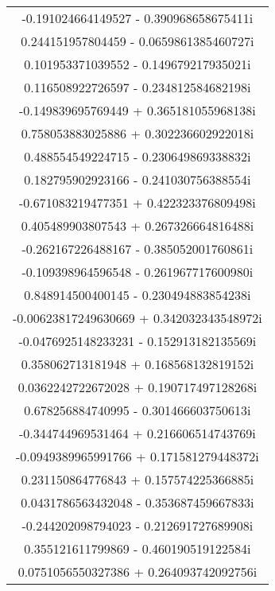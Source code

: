 \documentclass[12pt,a4paper,UTF8]{ctexart}
\begin{document}
\begin{enumerate}
\begin{longtable}{c}
              -0.191024664149527     -   0.390968658675411i   \\
              0.244151957804459      -   0.0659861385460727i  \\
              0.101953371039552      -   0.149679217935021i   \\
              0.116508922726597      -   0.234812584682198i   \\
              -0.149839695769449     +   0.365181055968138i   \\
              0.758053883025886      +   0.302236602922018i   \\
              0.488554549224715      -   0.230649869338832i   \\
              0.182795902923166      -   0.241030756388554i   \\
              -0.671083219477351     +   0.422323376809498i   \\
              0.405489903807543      +   0.267326664816488i   \\
              -0.262167226488167     -   0.385052001760861i   \\
              -0.109398964596548     -   0.261967717600980i   \\
              0.848914500400145      -   0.230494883854238i   \\
              -0.00623817249630669   +   0.342032343548972i   \\
              -0.0476925148233231    -   0.152913182135569i   \\
              0.358062713181948      +   0.168568132819152i   \\
              0.0362242722672028     +   0.190717497128268i   \\
              0.678256884740995      -   0.301466603750613i   \\
              -0.344744969531464     +   0.216606514743769i   \\
              -0.0949389965991766    +   0.171581279448372i   \\
              0.231150864776843      +   0.157574225366885i   \\
              0.0431786563432048     -   0.353687459667833i   \\
              -0.244202098794023     -   0.212691727689908i   \\
              0.355121611799869      -   0.460190519122584i   \\
              0.0751056550327386     +   0.264093742092756i   \\

\end{longtable}
\end{enumerate}
\end{document}
